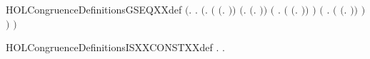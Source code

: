 \begin{SaveVerbatim}{HOLCongruenceDefinitionsGSEQXXdef}
\HOLTokenTurnstile{}  \HOLSymConst{\ensuremath{=}}
   \ensuremath{(}\HOLTokenLambda{}.
        \HOLSymConst{\HOLTokenForall{}}.
            \ensuremath{(}\HOLSymConst{\HOLTokenForall{}}.
                 \ensuremath{(} \HOLSymConst{\ensuremath{=}} \ensuremath{(}\HOLTokenLambda{}. \ensuremath{)}\ensuremath{)} \HOLSymConst{\HOLTokenDisj{}} \ensuremath{(}\HOLSymConst{\HOLTokenExists{}}.  \HOLSymConst{\ensuremath{=}} \ensuremath{(}\HOLTokenLambda{}. \ensuremath{)}\ensuremath{)} \HOLSymConst{\HOLTokenDisj{}}
                 \ensuremath{(}\HOLSymConst{\HOLTokenExists{}} . \ensuremath{(} \HOLSymConst{\ensuremath{=}} \ensuremath{(}\HOLTokenLambda{}. \HOLSymConst{\ensuremath{\ldotp}} \ensuremath{)}\ensuremath{)} \HOLSymConst{\HOLTokenConj{}}  \ensuremath{)} \HOLSymConst{\HOLTokenDisj{}}
                 \ensuremath{(}\HOLSymConst{\HOLTokenExists{}}   .
                      \ensuremath{(} \HOLSymConst{\ensuremath{=}} \ensuremath{(}\HOLTokenLambda{}. \HOLSymConst{\ensuremath{\ldotp}}  \HOLSymConst{\ensuremath{+}} \HOLSymConst{\ensuremath{\ldotp}} \ensuremath{)}\ensuremath{)} \HOLSymConst{\HOLTokenConj{}}
                        \HOLSymConst{\HOLTokenConj{}}  \ensuremath{)} \HOLSymConst{\HOLTokenImp{}}
                  \ensuremath{)} \HOLSymConst{\HOLTokenImp{}}
             \ensuremath{)}
\end{SaveVerbatim}
\newcommand{\HOLCongruenceDefinitionsGSEQXXdef}{\UseVerbatim{HOLCongruenceDefinitionsGSEQXXdef}}
\begin{SaveVerbatim}{HOLCongruenceDefinitionsISXXCONSTXXdef}
\HOLTokenTurnstile{} \HOLSymConst{\HOLTokenForall{}}.   \HOLSymConst{\HOLTokenEquiv{}} \HOLSymConst{\HOLTokenForall{}} .   \HOLSymConst{\ensuremath{=}}  
\end{SaveVerbatim}
